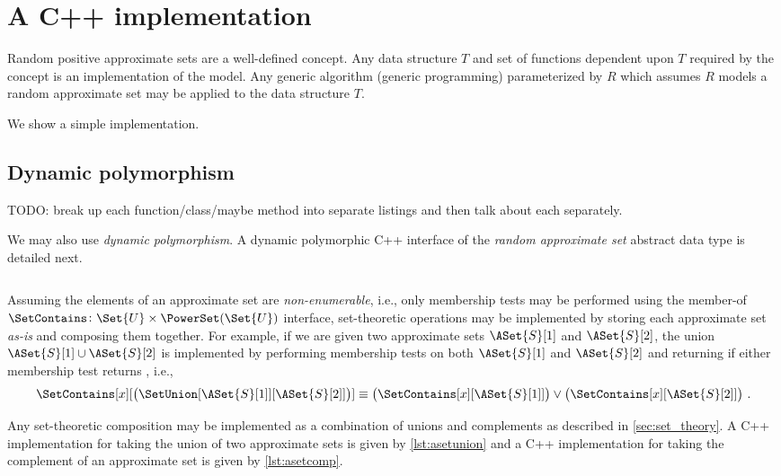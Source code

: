 \documentclass[ ../main.tex]{subfiles}
\begin{document}
\section{A C++ implementation}
\label{sec:impl}
Random positive approximate sets are a well-defined concept. Any data structure $T$ and set of functions dependent upon $T$ required by the concept is an implementation of the model.
Any generic algorithm (generic programming) parameterized by $R$ which assumes $R$ models a random approximate set may be applied to the data structure $T$.

We show a simple implementation.

\subsection{Dynamic polymorphism}
TODO: break up each function/class/maybe method into separate listings and then
talk about each separately.

We may also use \emph{dynamic polymorphism}. A dynamic polymorphic C++ 
interface of the \emph{random approximate set} abstract data type is detailed next.

\inputminted[breaklines,frame=lines,linenos]{c++}{code/random_approximate_sets_adt/include/approximate_set/dynamic/aset.hpp}

Assuming the elements of an approximate set are \emph{non-enumerable}, i.e., only membership tests may be performed using the member-of $\SetContains \colon \Set{U} \times \PowerSet(\Set{U})$ interface, set-theoretic operations may be implemented by storing each approximate set \emph{as-is} and composing them together. For example, if we are given two approximate sets $\ASet{S}[1]$ and $\ASet{S}[2]$, the union $\ASet{S}[1] \cup \ASet{S}[2]$ is implemented by performing membership tests on both $\ASet{S}[1]$ and $\ASet{S}[2]$ and returning \True if either membership test returns \True, i.e.,
\begin{equation}
\SetContains[x][\left(\SetUnion[\ASet{S}[1]][\ASet{S}[2]]\right)] \equiv \left(\SetContains[x][\ASet{S}[1]]\right) \lor \left(\SetContains[x][\ASet{S}[2]]\right)\,.
\end{equation}

Any set-theoretic composition may be implemented as a combination of unions and complements as described in \cref{sec:set_theory}. A C++ implementation for taking the union of two approximate sets is given by \cref{lst:asetunion} and a C++ implementation for taking the complement of an approximate set is given by \cref{lst:asetcomp}.
\end{document}
